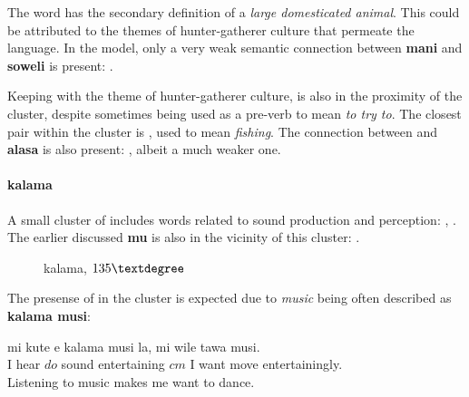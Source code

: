\documentclass[14pt, a4paper]{extreport}
\makeatletter
\DeclareRobustCommand\ttfamily
        {\not@math@alphabet\ttfamily\mathtt
         \fontfamily\ttdefault\small\selectfont}
\makeatother
\begin{document}
The word  has the secondary definition of a \textit{large domesticated animal}. This could be attributed to the themes of hunter-gatherer culture that permeate the language. In the model, only a very weak semantic connection between \textbf{mani} and \textbf{soweli} is present: .

Keeping with the theme of hunter-gatherer culture,  is also in the proximity of the cluster, despite sometimes being used as a pre-verb to mean \textit{to try to}. The closest pair within the cluster is , used to mean \textit{fishing}. The connection between  and \textbf{alasa} is also present: , albeit a much weaker one.
        \paragraph{kalama}
A small cluster of  includes words related to sound production and perception: , . The earlier discussed \textbf{mu} is also in the vicinity of this cluster: .

\begin{figure}[ht]%
  \def\angle{135}
  \bigskip
  \centering
  \caption{kalama, \(\angle\textdegree\)}
\end{figure}%

The presense of  in the cluster is expected due to \textit{music} being often described as \textbf{kalama musi}:

\begin{exe}
  \ex
  \gll mi kute e kalama musi la, mi wile tawa musi. \\
       I hear $do$ sound entertaining $cm$ I want move entertainingly. \\
  \glt Listening to music makes me want to dance.
\end{exe}
\end{document}

